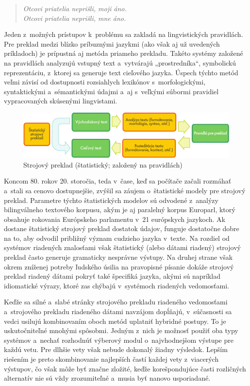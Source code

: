 \begin{multicols}{2}
\begin{verse}
\emph{Otcovi priatelia neprišli, moji áno.}\\
\smallskip
\emph{Otcovi priatelia neprišli, mne áno.}
\end{verse}

Jeden z~možných prístupov k~problému sa zakladá na lingvistických
pravidlách. Pre preklad medzi blízko príbuznými jazykmi (ako však aj
už uvedených príkladoch) je prípustná aj metóda priameho prekladu.
Takéto systémy založené na pravidlách analyzujú vstupný text
a~vytvárajú „prostredníka“, symbolickú reprezentáciu, z~ktorej
sa generuje text cieľového jazyka. Úspech týchto metód veľmi
závisí od dostupnosti rozsiahlych lexikónov
s~morfologickými, syntaktickými a~sémantickými údajmi a~aj
s~veľkými súbormi  pravidiel vypracovaných
skúsenými lingvistami. 

\begin{figure}[htb]
  \center
  \includegraphics[width=\textwidth]{../_media/slovak/machine_translation}
  \caption{Strojový preklad (štatistický; založený na pravidlách)}
  \label{fig:mtarch_sk}
\end{figure}

Koncom 80. rokov 20. storočia, teda v~čase, keď sa počítače
začali rozmáhať a~stali sa cenovo dostupnejšie, zvýšil sa záujem
o~štatistické modely pre strojový preklad. Parametre týchto
štatistických modelov sú odvodené z~analýzy bilingválneho
textového korpusu, akým je aj paralelný korpus Europarl,
ktorý obsahuje rokovania Európskeho parlamentu v~21 európskych
jazykoch. Ak dostane štatistický strojový preklad dostatok údajov,
funguje dostatočne dobre na to, aby odvodil približný význam
cudzieho jazyka v~texte. Na rozdiel od systémov riadených znalosťami
však štatistický (alebo dátami riadený) strojový preklad často
generuje gramaticky nesprávne výstupy. Na druhej strane však okrem
zníženej potreby ľudského úsilia na pravopisné písanie dokáže
strojový preklad riadený dátami pokryť také špecifiká jazyka,
akými sú napríklad idiomatické výrazy, ktoré zas chýbajú
v~systémoch riadených vedomosťami. 

Keďže sa silné a~slabé stránky strojového prekladu riadeného
vedomosťami a~strojového prekladu riadeného dátami navzájom
dopĺňajú, v~súčasnosti sa vedci usilujú kombinovaním oboch metód
uplatniť hybridné postupy. To je uskutočniteľné mnohými spôsobmi.
Jedným z~nich je možnosť použiť oba typy systémov a~nechať
rozhodnúť výberový modul o~najvhodnejšom výstupe pre každú vetu.
Pre dlhšie vety však nebude dokonalý žiadny výsledok. Lepším
riešením je preto skombinovanie najlepších častí každej vety
z~viacerých výstupov, čo však môže byť značne zložité, keďže
korešpondujúce časti rozličných alternatív nie sú vždy
zrozumiteľné a~musia byť nanovo usporiadané. 


\end{multicols}
